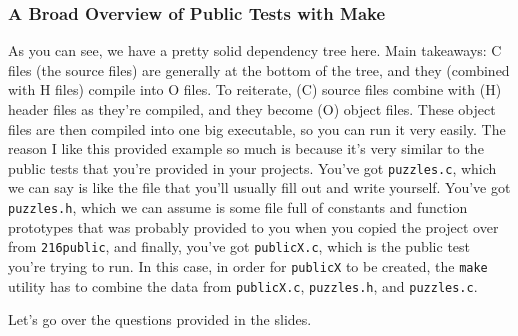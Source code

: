 \documentclass[english, 10pt]{article}
\begin{document}
{


}

\subsubsection{A Broad Overview of Public Tests with Make}

As you can see, we have a pretty solid dependency tree here. Main takeaways: C files (the source files) are generally at the bottom of the tree, and they (combined with H files) compile into O files. To reiterate, (C) source files combine with (H) header files as they're compiled, and they become (O) object files. These object files are then compiled into one big executable, so you can run it very easily. The reason I like this provided example so much is because it's very similar to the public tests that you're provided in your projects. You've got \texttt{puzzles.c}, which we can say is like the file that you'll usually fill out and write yourself. You've got \texttt{puzzles.h}, which we can assume is some file full of constants and function prototypes that was probably provided to you when you copied the project over from \texttt{216public}, and finally, you've got \texttt{publicX.c}, which is the public test you're trying to run. In this case, in order for \texttt{publicX} to be created, the \texttt{make} utility has to combine the data from \texttt{publicX.c}, \texttt{puzzles.h}, and \texttt{puzzles.c}.\newline

Let's go over the questions provided in the slides.\newline
\end{document}

